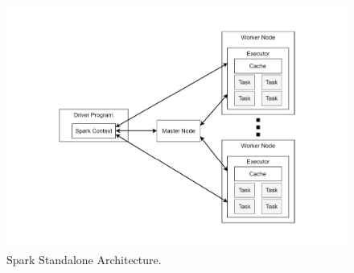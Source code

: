 \begin{figure}
	\centering
	\includegraphics[width=\columnwidth]{Images/spark_standalone_architecture.pdf}  
	\caption[Spark Standalone Architecture]{Spark Standalone Architecture.}
	\label{fig:sparkStandaloneArchitecture}
\end{figure}

